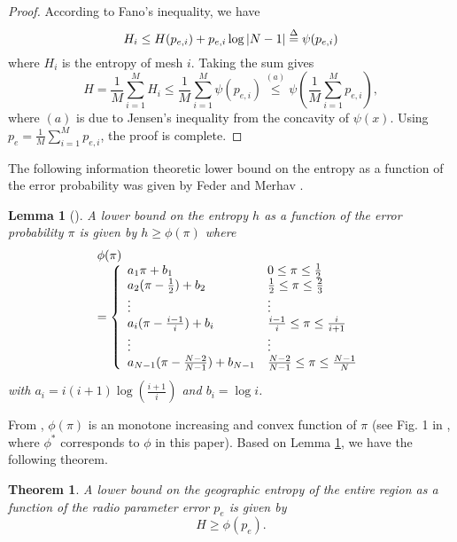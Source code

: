 \documentclass[conference]{IEEEtran}
\newtheorem{Theo}{Theorem}
\newtheorem{Lemm}{Lemma}
\begin{document}
\begin{proof}
According to Fano's inequality, we have
\begin{equation}
{H_i} \le H({p_{e,i}}) + {p_{e,i}}\log \left| {N - 1} \right| \buildrel \Delta \over = \psi ({p_{e,i}})
\end{equation}
where $H_i$ is the entropy of mesh $i$.
Taking the sum gives
\begin{equation}
H = \frac{1}{M}\sum\limits_{i = 1}^M {{H_i}}  \le \frac{1}{M}\sum\limits_{i = 1}^M {\psi ({p_{e,i}})} \mathop  \le \limits^{(a)} \psi \left( {\frac{1}{M}\sum\limits_{i = 1}^M {{p_{e,i}}} } \right),
\end{equation}
where $(a)$ is due to Jensen's inequality from the concavity of $\psi (x)$.
Using ${p_e} = \frac{1}{M}\sum\limits_{i = 1}^M {{p_{e,i}}}$, the proof is complete.
\end{proof}
The following information theoretic lower bound on the entropy as a function of the error probability was given by Feder and Merhav \cite{Meir}.
\begin{Lemm}[\cite{Meir}]\label{lemma_meir}
A lower bound on the entropy $h$ as a function of the error probability $\pi$ is given by $h \ge {\phi}(\pi)$ where
\begin{equation}
\begin{array}{l}
 {\phi}(\pi ) \\
  = \left\{ {\begin{array}{*{20}{c}}
   {{a_1}\pi  + {b_1}} \hfill & {0 \le \pi  \le \frac{1}{2}} \hfill  \\
   {{a_2}(\pi  - \frac{1}{2}) + {b_2}} \hfill & {\frac{1}{2} \le \pi  \le \frac{2}{3}} \hfill  \\
    \vdots  \hfill &  \vdots  \hfill  \\
   {{a_i}(\pi  - \frac{{i - 1}}{i}) + {b_i}} \hfill & {\frac{{i - 1}}{i} \le \pi  \le \frac{i}{{i + 1}}} \hfill  \\
    \vdots  \hfill &  \vdots  \hfill  \\
   {{a_{N - 1}}(\pi  - \frac{{N - 2}}{{N - 1}}) + {b_{N - 1}}} \hfill & {\frac{{N - 2}}{{N - 1}} \le \pi  \le \frac{{N - 1}}{N}} \hfill  \\
\end{array}} \right. \\
 \end{array}
\end{equation}
with ${a_i} = i(i + 1)\log \left( {\frac{{i + 1}}{i}} \right)$ and ${b_i} = \log i$.
\end{Lemm}
From \cite{Meir}, ${\phi}(\pi )$ is an monotone increasing and convex function of $\pi$
(see Fig. 1 in \cite{Meir}, where $\phi^*$ corresponds to $\phi$ in this paper).
Based on Lemma \ref{lemma_meir}, we have the following theorem.
\begin{Theo}\label{th_relation_lowerbound}
A lower bound on the geographic entropy of the entire region as a function of the radio parameter error $p_e$ is given by
\begin{equation}\label{relation_lowerbound}
H \ge {\phi}({p_e}).
\end{equation}
\end{Theo}
\end{document}
